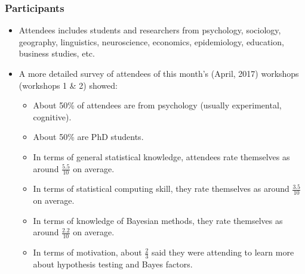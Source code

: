 \begin{frame}
	\frametitle{Participants}

	\begin{itemize}
		\item Attendees includes students and researchers from psychology, sociology, geography, linguistics, neuroscience, economics, epidemiology, education, business studies, etc.
		\item A more detailed survey of attendees of this month's (April, 2017) workshops (workshops 1 \& 2) showed:
			\begin{itemize}
				\item About 50\% of attendees are from psychology (usually experimental, cognitive).
				\item About 50\% are PhD students.
				\item In terms of general statistical knowledge, attendees rate themselves as around $\tfrac{5.5}{10}$ on average.
				\item In terms of statistical computing skill, they rate themselves as around $\tfrac{3.5}{10}$ on average.
				\item In terms of knowledge of Bayesian methods, they rate themselves as around $\tfrac{2.2}{10}$ on average.
				\item In terms of motivation, about $\tfrac{2}{3}$ said they were attending to learn more about hypothesis testing and Bayes factors.
			\end{itemize}
	\end{itemize}

\end{frame}
